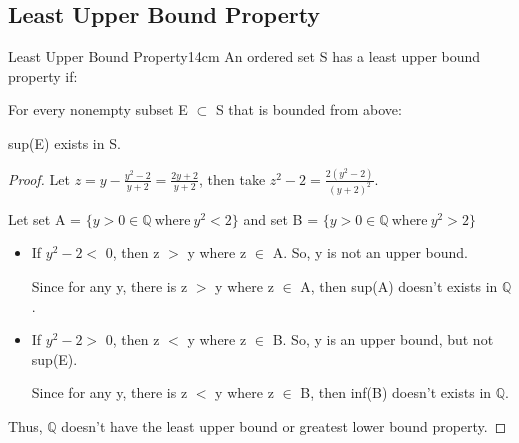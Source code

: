 	\newpage



	
\subsection{ Least Upper Bound Property }

	\begin{wtheorem}{Least Upper Bound Property}{14cm}
		An ordered set S has a least upper bound property if:

		\hspace{0.5cm}
		For every nonempty subset E $ \subset $ S that is bounded from above:

		\hspace{1cm}
		sup(E) exists in S.
	\end{wtheorem}

	\begin{proof}
		Let $ z = y - \frac{y^2-2}{y+2} = \frac{2y+2}{y+2} $,
		then take $ z^2-2 = \frac{2(y^2-2)}{(y+2)^2} $.

		Let set A = $ \{ y > 0 \in \mathbb{Q} \ \text{where} \ y^2 < 2 \} $ and
		set B = $ \{ y > 0 \in \mathbb{Q} \ \text{where} \ y^2 > 2 \} $

		\begin{itemize}[leftmargin=1cm, itemsep=0.1cm]
			\item If $ y^2-2 < $ 0, then z $>$ y where z $\in$ A.
				So, y is not an upper bound.

				Since for any y, there is z $>$ y where z $\in$ A, then
				sup(A) doesn't exists in $\mathbb{Q}$.
		
			\item If $ y^2-2 > $ 0, then z $<$ y where z $\in$ B.
				So, y is an upper bound, but not sup(E).

				Since for any y, there is z $<$ y where z $\in$ B, then
				inf(B) doesn't exists in $\mathbb{Q}$.
		\end{itemize}

		Thus, $\mathbb{Q}$ doesn't have the least upper bound or
		greatest lower bound property.
	\end{proof}

	\vspace{0.5cm}



